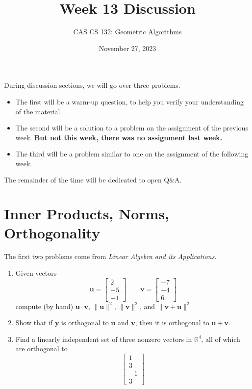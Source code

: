 \documentclass{article}
\title{
  Week 13 Discussion
}
\author{CAS CS 132: Geometric Algorithms}
\date{November 27, 2023}
\newcommand{\vv}[1]{\mathbf{#1}}
\newcommand{\R}{\mathbb R}
\theoremstyle{remark}
\begin{document}
\maketitle

\noindent During discussion sections, we will go over three problems.
\begin{itemize}
\item The first will be a warm-up question, to help you verify your understanding of the material.
\item The second will be a solution to a problem on the assignment of the previous week. \textbf{But not this week, there was no assignment last week.}
\item The third will be a problem similar to one on the assignment of the following week.
\end{itemize}
The remainder of the time will be dedicated to open Q\&A.

\pagebreak
\section{Inner Products, Norms, Orthogonality}

The first two problems come from \textit{Linear Algebra and its Applications}.

\begin{enumerate}
\item Given vectors
  \begin{displaymath}
    \vv u =
    \begin{bmatrix}
      2 \\ -5 \\ -1
    \end{bmatrix}
    \qquad
    \vv v =
    \begin{bmatrix}
      -7 \\ -4 \\ 6
    \end{bmatrix}
  \end{displaymath}
  compute (by hand) $\vv u \cdot \vv v$, $\|\vv u\|^2$, $\|\vv v\|^2$, and $\|\vv v + \vv u\|^2$
\item
  Show that if $\vv y$ is orthogonal to $\vv u$ and $\vv v$, then it is orthogonal to $\vv u + \vv v$.
\item Find a linearly independent set of three nonzero vectors in $\R^4$, all of which are orthogonal to
  \begin{displaymath}
    \begin{bmatrix}
      1 \\ 3 \\ -1 \\ 3
    \end{bmatrix}
  \end{displaymath}
\end{enumerate}
\end{document}
